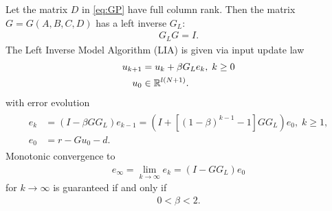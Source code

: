 \begin{alg}
	\label{alg: leftInv}
	Let the matrix $D$ in \eqref{eq:GP} have full column rank. Then the matrix $G = G(A, B, C, D)$ has a left inverse $G_L$: 
	\begin{align*}
	G_L G = I. 
	\end{align*}
	The Left Inverse Model Algorithm (LIA) is given via input update law
	\begin{align}
	\begin{split}
	u_{k+1} &= u_k + \beta G_L e_k, \; k\geq 0 \\
	u_0& \in {\mathbb{R}}^{l (N+1)}. 
	\end{split}	
	\end{align}
	with error evolution
	\begin{align}
	\label{eq:errLeftInv}
	\begin{split}
	e_{k} &= (I- \beta G G_L) e_{k-1} = (I+  \left[(1-\beta)^{k-1} - 1\right] G G_L) e_0, \; k\geq 1, \\
	e_0 &= r -  Gu_0 -d.
	\end{split}
	\end{align}
	Monotonic convergence to 
	\begin{align}
	\label{eq:leftInvErrLim} 
	e_\infty  = \lim_{k\to\infty} e_k = (I - G G_L)e_0
	\end{align} 
	for $k \to \infty$ is guaranteed if and only if 
	\begin{align*}
	0 <\beta < 2.
	\end{align*}
\end{alg}
